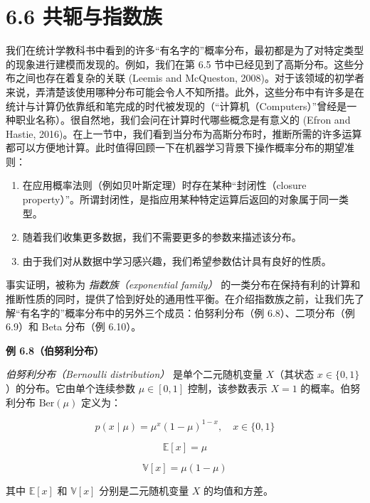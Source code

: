 \section*{6.6 共轭与指数族}
\label{sec:6.6}

我们在统计学教科书中看到的许多“有名字的”概率分布，最初都是为了对特定类型的现象进行建模而发现的。例如，我们在第 6.5 节中已经见到了高斯分布。这些分布之间也存在着复杂的关联 (Leemis and McQueston, 2008)。对于该领域的初学者来说，弄清楚该使用哪种分布可能会令人不知所措。此外，这些分布中有许多是在统计与计算仍依靠纸和笔完成的时代被发现的（“计算机（Computers）”曾经是一种职业名称）。很自然地，我们会问在计算时代哪些概念是有意义的 (Efron and Hastie, 2016)。在上一节中，我们看到当分布为高斯分布时，推断所需的许多运算都可以方便地计算。此时值得回顾一下在机器学习背景下操作概率分布的期望准则：

\begin{enumerate}
\item 在应用概率法则（例如贝叶斯定理）时存在某种“封闭性（closure property）”。所谓封闭性，是指应用某种特定运算后返回的对象属于同一类型。
\item 随着我们收集更多数据，我们不需要更多的参数来描述该分布。
\item 由于我们对从数据中学习感兴趣，我们希望参数估计具有良好的性质。
\end{enumerate}

事实证明，被称为 \emph{指数族（exponential family）} 的一类分布在保持有利的计算和推断性质的同时，提供了恰到好处的通用性平衡。在介绍指数族之前，让我们先了解“有名字的”概率分布中的另外三个成员：伯努利分布（例 6.8）、二项分布（例 6.9）和 Beta 分布（例 6.10）。

\begin{notebox}
\textbf{例 6.8（伯努利分布）}
\end{notebox}

\begin{notebox}
\emph{伯努利分布（Bernoulli distribution）} 是单个二元随机变量 $ X $（其状态 $ x \in \{0, 1\} $）的分布。它由单个连续参数 $ \mu \in [0, 1] $ 控制，该参数表示 $ X = 1 $ 的概率。伯努利分布 $ \mathrm{Ber}(\mu) $ 定义为：

\begin{equation}
p(x \mid \mu) = \mu^x (1 - \mu)^{1-x}, \quad x \in \{0, 1\}
\tag{6.92}\label{eq:6-92}
\end{equation}

\begin{equation}
\mathbb{E}[x] = \mu
\tag{6.93}\label{eq:6-93}
\end{equation}

\begin{equation}
\mathbb{V}[x] = \mu(1 - \mu)
\tag{6.94}\label{eq:6-94}
\end{equation}

其中 $ \mathbb{E}[x] $ 和 $ \mathbb{V}[x] $ 分别是二元随机变量 $ X $ 的均值和方差。
\end{notebox}

